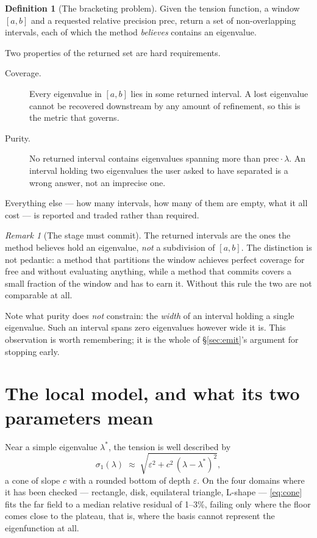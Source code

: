 \documentclass[11pt]{article}
\theoremstyle{definition}
\newtheorem{definition}{Definition}
\theoremstyle{remark}
\newtheorem{remark}{Remark}
\newcommand{\lam}{\lambda}
\newcommand{\sig}{\sigma}
\newcommand{\pr}{\mathrm{prec}}
\begin{document}
\begin{definition}[The bracketing problem]
Given the tension function, a window $[a,b]$ and a requested relative precision $\pr$,
return a set of non-overlapping intervals, each of which the method \emph{believes} contains
an eigenvalue.
\end{definition}

Two properties of the returned set are hard requirements.

\begin{description}
\item[Coverage.] Every eigenvalue in $[a,b]$ lies in some returned interval. A lost eigenvalue
cannot be recovered downstream by any amount of refinement, so this is the metric that governs.
\item[Purity.] No returned interval contains eigenvalues spanning more than $\pr\cdot\lam$.
An interval holding two eigenvalues the user asked to have separated is a wrong answer, not an
imprecise one.
\end{description}

Everything else --- how many intervals, how many of them are empty, what it all cost --- is
reported and traded rather than required.

\begin{remark}[The stage must commit]
The returned intervals are the ones the method believes hold an eigenvalue, \emph{not} a
subdivision of $[a,b]$. The distinction is not pedantic: a method that partitions the window
achieves perfect coverage for free and without evaluating anything, while a method that
commits covers a small fraction of the window and has to earn it. Without this rule the two
are not comparable at all.
\end{remark}

Note what purity does \emph{not} constrain: the \emph{width} of an interval holding a single
eigenvalue. Such an interval spans zero eigenvalues however wide it is. This observation is
worth remembering; it is the whole of \S\ref{sec:emit}'s argument for stopping early.

\section{The local model, and what its two parameters mean}
\label{sec:cone}

Near a simple eigenvalue $\lam^*$, the tension is well described by
\begin{equation}\label{eq:cone}
  \sig_1(\lam)\;\approx\;\sqrt{\varepsilon^2 + c^2\,(\lam-\lam^*)^2},
\end{equation}
a cone of slope $c$ with a rounded bottom of depth $\varepsilon$. On the four domains where it
has been checked --- rectangle, disk, equilateral triangle, L-shape --- \eqref{eq:cone} fits
the far field to a median relative residual of 1--3\%, failing only where the floor comes close
to the plateau, that is, where the basis cannot represent the eigenfunction at all.
\end{document}
